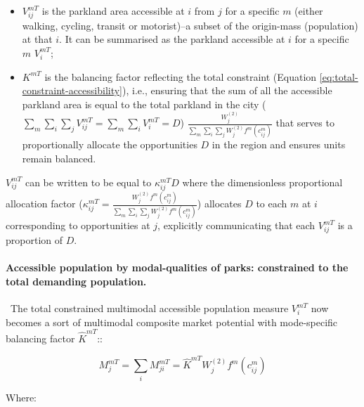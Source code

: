 \documentclass[
11pt, %
oneside, %
english, %
singlespacing, %
]{macthesis} %
\def\tightlist{}
\begin{document}
\begin{itemize}
\tightlist
\item
  \(V^{mT}_{ij}\) is the parkland area accessible at \(i\) from \(j\) for a specific \(m\) (either walking, cycling, transit or motorist)--a subset of the origin-mass (population) at that \(i\). It can be summarised as the parkland accessible at \(i\) for a specific \(m\) \(V^{mT}_{i}\);
\item
  \(K^{mT}\) is the balancing factor reflecting the total constraint (Equation \ref{eq:total-constraint-accessibility}), i.e., ensuring that the sum of all the accessible parkland area is equal to the total parkland in the city (\(\sum_m\sum_i\sum_j V^{mT}_{ij} = \sum_m \sum_i V^{mT}_{i} = D\)) \(\frac{W^{(2)}_j}{\sum_m\sum_i\sum_j W^{(2)}_jf^m(c^m_{ij})}\) that serves to proportionally allocate the opportunities \(D\) in the region and ensures units remain balanced.
\end{itemize}

\(V_{ij}^{mT}\) can be written to be equal to \(\kappa_{ij}^{mT} D\) where the dimensionless proportional allocation factor (\(\kappa_{ij}^{mT} = \frac{W_j^{(2)} f^m(c^m_{ij})}{\sum_m\sum_i\sum_j W^{(2)}_jf^m(c^m_{ij})}\)) allocates \(D\) to each \(m\) at \(i\) corresponding to opportunities at \(j\), explicitly communicating that each \(V_{ij}^{mT}\) is a proportion of \(D\).

\paragraph{Accessible population by modal-qualities of parks: constrained to the total demanding population.}\label{accessible-population-by-modal-qualities-of-parks-constrained-to-the-total-demanding-population.}

~The total constrained multimodal accessible population measure \(V^{mT}_{i}\) now becomes a sort of multimodal composite market potential with mode-specific balancing factor \(\hat K^{mT}\)::

\begin{equation}
\label{eq:total-constrained-multimodal-market-park}
M^{mT}_{j} = \sum_i M^{mT}_{ji} = \hat K^{mT} W_j^{(2)} f^m(c^m_{ij})
\end{equation} 

Where:
\end{document}
